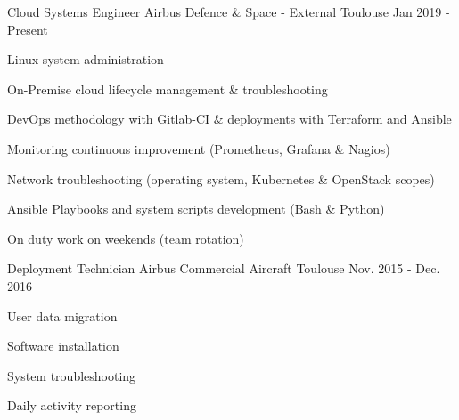 

\begin{cventries}

  \cventry
    {Cloud Systems Engineer} %
    {Airbus Defence \& Space - External} %
    {Toulouse} %
    {Jan 2019 - Present} %
    {
      \begin{cvitems} %
        \item {Linux system administration}
        \item {On-Premise cloud lifecycle management \& troubleshooting}
        \item {DevOps methodology with Gitlab-CI \& deployments with Terraform and Ansible}
        \item {Monitoring continuous improvement (Prometheus, Grafana \& Nagios)}
        \item {Network troubleshooting (operating system, Kubernetes \& OpenStack scopes)}
        \item {Ansible Playbooks and system scripts development (Bash \& Python)}
        \item {On duty work on weekends (team rotation)}
      \end{cvitems}
    }

  \cventry
    {Deployment Technician} %
    {Airbus Commercial Aircraft} %
    {Toulouse} %
    {Nov. 2015 - Dec. 2016} %
    {
      \begin{cvdoubleitems} %
        \item {User data migration}
        \item {Software installation}
        \item {System troubleshooting}
        \item {Daily activity reporting}
      \end{cvdoubleitems}
    }



\end{cventries}
